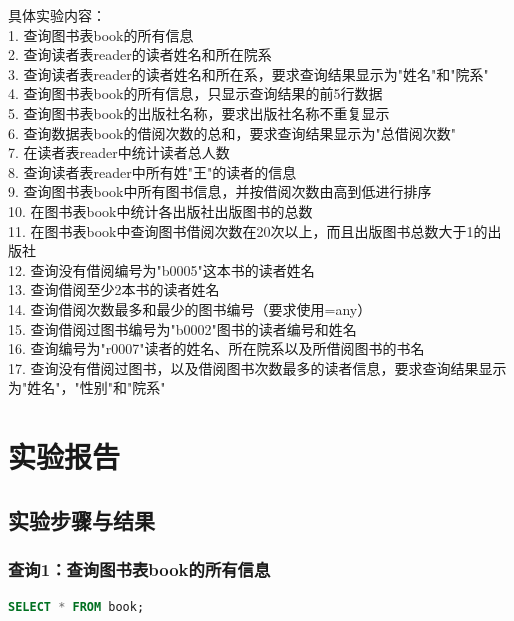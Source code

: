 \documentclass[a4paper]{article}
\begin{document}
具体实验内容：\\
1. 查询图书表book的所有信息\\
2. 查询读者表reader的读者姓名和所在院系\\
3. 查询读者表reader的读者姓名和所在系，要求查询结果显示为"姓名"和"院系"\\
4. 查询图书表book的所有信息，只显示查询结果的前5行数据\\
5. 查询图书表book的出版社名称，要求出版社名称不重复显示\\
6. 查询数据表book的借阅次数的总和，要求查询结果显示为"总借阅次数"\\
7. 在读者表reader中统计读者总人数\\
8. 查询读者表reader中所有姓"王"的读者的信息\\
9. 查询图书表book中所有图书信息，并按借阅次数由高到低进行排序\\
10. 在图书表book中统计各出版社出版图书的总数\\
11. 在图书表book中查询图书借阅次数在20次以上，而且出版图书总数大于1的出版社\\
12. 查询没有借阅编号为"b0005"这本书的读者姓名\\
13. 查询借阅至少2本书的读者姓名\\
14. 查询借阅次数最多和最少的图书编号（要求使用=any）\\
15. 查询借阅过图书编号为"b0002"图书的读者编号和姓名\\
16. 查询编号为"r0007"读者的姓名、所在院系以及所借阅图书的书名\\
17. 查询没有借阅过图书，以及借阅图书次数最多的读者信息，要求查询结果显示为"姓名"，"性别"和"院系"

\section{实验报告}

\subsection{实验步骤与结果}

\subsubsection{查询1：查询图书表book的所有信息}

\begin{lstlisting}[language=SQL, caption=查询图书表所有信息]
SELECT * FROM book;
\end{lstlisting}
\end{document}

